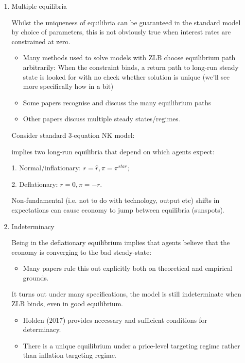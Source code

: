 \documentclass[10pt,math=newtx,citestyle=gb7714-2015,bibstyle=gb7714-2015]{elegantbook}
\begin{document}
{\begin{enumerate}
	\item Multiple equilibria
	
	Whilst the uniqueness of equilibria can be guaranteed in the standard model by choice of parameters, this is not obviously true when interest rates are constrained at zero.
	\begin{itemize}
		\item Many methods used to solve models with ZLB choose equilibrium path arbitrarily: When the constraint binds, a return path to long-run steady state is looked for with no check whether solution is unique (we'll see more specifically how in a bit)
		\item Some papers recognise and discuss the many equilibrium paths
		\item Other papers discuss multiple steady states/regimes.
	\end{itemize}
	
	Consider standard 3-equation NK model:
	
	implies two long-run equilibria that depend on which agents expect:
	
	1. Normal/inflationary: $r=\hat{r},\pi=\pi^{star}$;
	
	2. Deflationary: $r=0,\pi=-r$.
	
	Non-fundamental (i.e. not to do with technology, output etc) shifts in expectations can cause economy to jump between equilibria (sunspots).
	
	\item Indeterminacy
	
	Being in the deflationary equilibrium implies that agents believe that the economy is converging to the bad steady-state:
	\begin{itemize}
		\item Many papers rule this out explicitly both on theoretical and empirical grounds.
	\end{itemize}
	
	It turns out under many specifications, the model is still indeterminate when ZLB binds, even in good equilibrium.
	\begin{itemize}
		\item Holden (2017) provides necessary and sufficient conditions for determinacy.
		\item There is a unique equilibrium under a price-level targeting regime rather than inflation targeting regime.
	\end{itemize}
	

\end{enumerate}}
\end{document}
